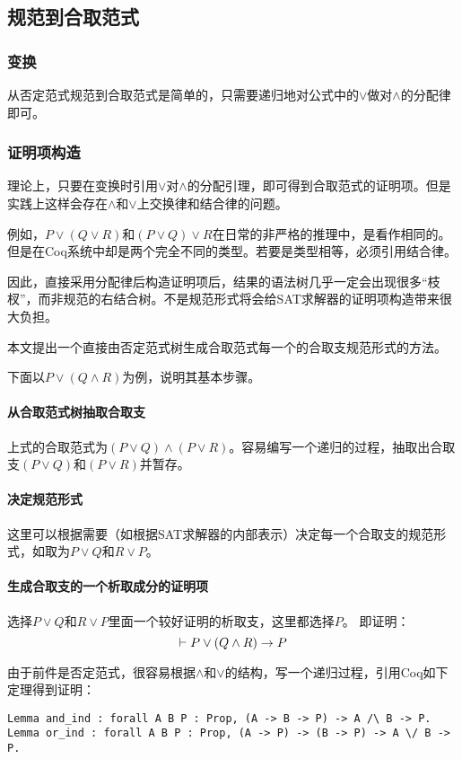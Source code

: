 \subsection{规范到合取范式}
\subsubsection{变换}
从否定范式规范到合取范式是简单的，只需要递归地对公式中的$\lor$做对$\land$的分配律即可。

\subsubsection{证明项构造}
理论上，只要在变换时引用$\lor$对$\land$的分配引理，即可得到合取范式的证明项。但是实践上这样会存在$\land$和$\lor$上交换律和结合律的问题。

例如，$P \lor (Q \lor R)$和$(P \lor Q) \lor R$在日常的非严格的推理中，是看作相同的。但是在Coq系统中却是两个完全不同的类型。若要是类型相等，必须引用结合律。

因此，直接采用分配律后构造证明项后，结果的语法树几乎一定会出现很多“枝杈”，而非规范的右结合树。不是规范形式将会给SAT求解器的证明项构造带来很大负担。

本文提出一个直接由否定范式树生成合取范式每一个的合取支规范形式的方法。

下面以$P \lor (Q \land R)$为例，说明其基本步骤。

\paragraph{从合取范式树抽取合取支}
上式的合取范式为$(P \lor Q) \land (P \lor R)$。容易编写一个递归的过程，抽取出合取支$(P \lor Q)$和$(P \lor R)$并暂存。

\paragraph{决定规范形式}
这里可以根据需要（如根据SAT求解器的内部表示）决定每一个合取支的规范形式，如取为$P \lor Q$和$R \lor P$。

\paragraph{生成合取支的一个析取成分的证明项}
选择$P \lor Q$和$R \lor P$里面一个较好证明的析取支，这里都选择$P$。
即证明：
$$ \vdash P \lor (Q \land R) \rightarrow P $$

由于前件是否定范式，很容易根据$\land$和$\lor$的结构，写一个递归过程，引用Coq如下定理得到证明：
\begin{verbatim}
Lemma and_ind : forall A B P : Prop, (A -> B -> P) -> A /\ B -> P.
Lemma or_ind : forall A B P : Prop, (A -> P) -> (B -> P) -> A \/ B -> P.
\end{verbatim}

